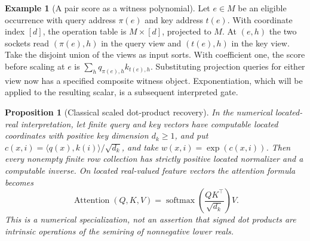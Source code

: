 \documentclass[11pt,a4paper]{article}
\newtheorem{proposition}[proposition]{Proposition}
\theoremstyle{definition}
\newtheorem{example}[example]{Example}
\theoremstyle{remark}\newaliascnt{remark}{theorem}
\numberwithin{equation}{section}
\begin{document}
\begin{example}[A pair score as a witness polynomial]\label{ex:score-witness}
Let $e\in M$ be an eligible occurrence with query address $\pi(e)$ and key address $t(e)$. With coordinate index $[d]$, the operation table is $M\times[d]$, projected to $M$. At $(e,h)$ the two sockets read $(\pi(e),h)$ in the query view and $(t(e),h)$ in the key view. Take the disjoint union of the views as input sorts. With coefficient one, the score before scaling at $e$ is $\sum_h q_{\pi(e),h}k_{t(e),h}$. Substituting projection queries for either view now has a specified composite witness object. Exponentiation, which will be applied to the resulting scalar, is a subsequent interpreted gate.
\end{example}

\begin{proposition}[Classical scaled dot-product recovery]
\label{prop:attention-softmax}
In the numerical located-real interpretation, let finite query and key
vectors have computable located coordinates with positive key
dimension $d_k\ge1$, and put
$c(x,i)=\langle q(x),k(i)\rangle/\sqrt{d_k}$, and take
$w(x,i)=\exp(c(x,i))$. Then every nonempty finite row collection has
strictly positive located normalizer and a computable inverse. On
located real-valued feature vectors the attention formula becomes
\begin{equation}\label{eq:attention-softmax}
 \operatorname{Attention}(Q,K,V)
 =\operatorname{softmax}\!\left(\frac{QK^\top}{\sqrt{d_k}}\right)V.
\end{equation}
This is a numerical specialization, not an assertion that signed dot
products are intrinsic operations of the semiring of nonnegative lower reals.
\end{proposition}
\end{document}
